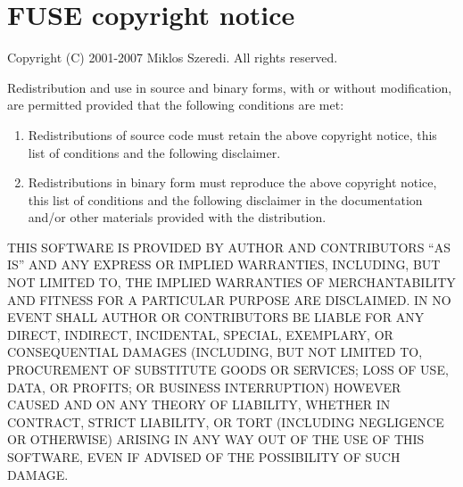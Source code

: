 
\chapter{FUSE copyright notice}
\label{app:copyright}

\noindent
Copyright (C) 2001-2007 Miklos Szeredi. All rights reserved.

\vspace{2ex}
\noindent
Redistribution and use in source and binary forms, with or without modification,
are permitted provided that the following conditions are met:
\begin{enumerate}
	\item Redistributions of source code must retain the above copyright notice,
		  this list of conditions and the following disclaimer.
	\item Redistributions in binary form must reproduce the above copyright
		  notice, this list of conditions and the following disclaimer in the
		  documentation and/or other materials provided with the distribution.
\end{enumerate}

\noindent
THIS SOFTWARE IS PROVIDED BY AUTHOR AND CONTRIBUTORS ``AS IS'' AND
ANY EXPRESS OR IMPLIED WARRANTIES, INCLUDING, BUT NOT LIMITED TO, THE
IMPLIED WARRANTIES OF MERCHANTABILITY AND FITNESS FOR A PARTICULAR PURPOSE
ARE DISCLAIMED.  IN NO EVENT SHALL AUTHOR OR CONTRIBUTORS BE LIABLE
FOR ANY DIRECT, INDIRECT, INCIDENTAL, SPECIAL, EXEMPLARY, OR CONSEQUENTIAL
DAMAGES (INCLUDING, BUT NOT LIMITED TO, PROCUREMENT OF SUBSTITUTE GOODS
OR SERVICES; LOSS OF USE, DATA, OR PROFITS; OR BUSINESS INTERRUPTION)
HOWEVER CAUSED AND ON ANY THEORY OF LIABILITY, WHETHER IN CONTRACT, STRICT
LIABILITY, OR TORT (INCLUDING NEGLIGENCE OR OTHERWISE) ARISING IN ANY WAY
OUT OF THE USE OF THIS SOFTWARE, EVEN IF ADVISED OF THE POSSIBILITY OF
SUCH DAMAGE.

